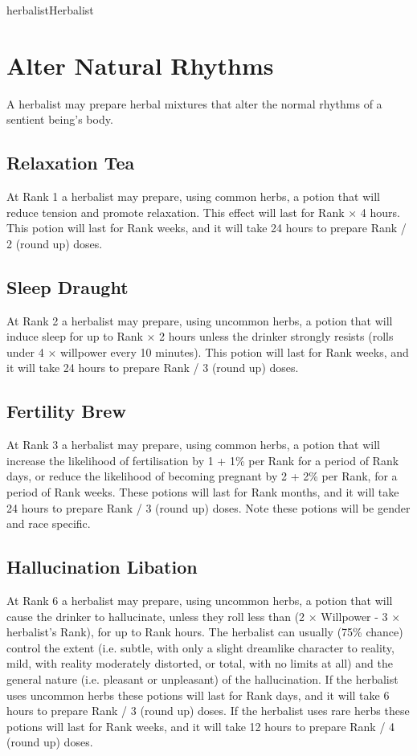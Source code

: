 \begin{Skill}[1.1]{herbalist}{Herbalist}
\section{Alter Natural Rhythms}

A herbalist may prepare herbal mixtures that alter the normal rhythms
of a sentient being’s body.

\subsection{Relaxation Tea}

At Rank 1 a herbalist may prepare, using common herbs, a potion that
will reduce tension and promote relaxation.  This effect will last for
Rank × 4 hours.  This potion will last for Rank weeks, and it will take
24 hours to prepare Rank / 2 (round up) doses.

\subsection{Sleep Draught}

At Rank 2 a herbalist may prepare, using uncommon herbs, a potion that
will induce sleep for up to Rank × 2 hours unless the drinker strongly
resists (rolls under 4 × willpower every 10 minutes).  This potion
will last for Rank weeks, and it will take 24 hours to prepare Rank /
3 (round up) doses.

\subsection{Fertility Brew}

At Rank 3 a herbalist may prepare, using common herbs, a potion that
will increase the likelihood of fertilisation by 1 + 1\% per Rank for
a period of Rank days, or reduce the likelihood of becoming pregnant
by 2 + 2\% per Rank, for a period of Rank weeks.  These potions will
last for Rank months, and it will take 24 hours to prepare Rank / 3
(round up) doses.  Note these potions will be gender and race
specific.

\subsection{Hallucination Libation}

At Rank 6 a herbalist may prepare, using uncommon herbs, a potion that
will cause the drinker to hallucinate, unless they roll less than (2 ×
Willpower - 3 × herbalist’s Rank), for up to Rank hours.  The
herbalist can usually (75\% chance) control the extent (i.e. subtle,
with only a slight dreamlike character to reality, mild, with reality
moderately distorted, or total, with no limits at all) and the general
nature (i.e. pleasant or unpleasant) of the hallucination.  If the
herbalist uses uncommon herbs these potions will last for Rank days,
and it will take 6 hours to prepare Rank / 3 (round up) doses.  If the
herbalist uses rare herbs these potions will last for Rank weeks, and
it will take 12 hours to prepare Rank / 4 (round up) doses.


\end{Skill}

